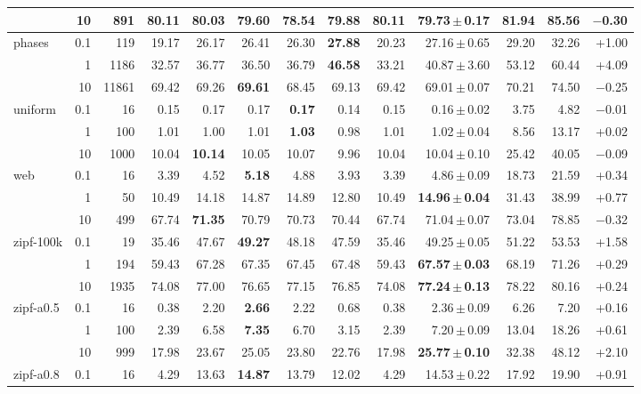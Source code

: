 \begin{tabular}{lrrrrrrrrrrrr}
 & 10 & 891 & \textbf{80.11} & 80.03 & 79.60 & 78.54 & 79.88 & \textbf{80.11} & 79.73\,$\pm$\,0.17 & 81.94 & 85.56 & $-$0.30 \\
\midrule
phases & 0.1 & 119 & 19.17 & 26.17 & 26.41 & 26.30 & \textbf{27.88} & 20.23 & 27.16\,$\pm$\,0.65 & 29.20 & 32.26 & +1.00 \\
 & 1 & 1186 & 32.57 & 36.77 & 36.50 & 36.79 & \textbf{46.58} & 33.21 & 40.87\,$\pm$\,3.60 & 53.12 & 60.44 & +4.09 \\
 & 10 & 11861 & 69.42 & 69.26 & \textbf{69.61} & 68.45 & 69.13 & 69.42 & 69.01\,$\pm$\,0.07 & 70.21 & 74.50 & $-$0.25 \\
\midrule
uniform & 0.1 & 16 & 0.15 & 0.17 & 0.17 & \textbf{0.17} & 0.14 & 0.15 & 0.16\,$\pm$\,0.02 & 3.75 & 4.82 & $-$0.01 \\
 & 1 & 100 & 1.01 & 1.00 & 1.01 & \textbf{1.03} & 0.98 & 1.01 & 1.02\,$\pm$\,0.04 & 8.56 & 13.17 & +0.02 \\
 & 10 & 1000 & 10.04 & \textbf{10.14} & 10.05 & 10.07 & 9.96 & 10.04 & 10.04\,$\pm$\,0.10 & 25.42 & 40.05 & $-$0.09 \\
\midrule
web & 0.1 & 16 & 3.39 & 4.52 & \textbf{5.18} & 4.88 & 3.93 & 3.39 & 4.86\,$\pm$\,0.09 & 18.73 & 21.59 & +0.34 \\
 & 1 & 50 & 10.49 & 14.18 & 14.87 & 14.89 & 12.80 & 10.49 & \textbf{14.96\,$\pm$\,0.04} & 31.43 & 38.99 & +0.77 \\
 & 10 & 499 & 67.74 & \textbf{71.35} & 70.79 & 70.73 & 70.44 & 67.74 & 71.04\,$\pm$\,0.07 & 73.04 & 78.85 & $-$0.32 \\
\midrule
zipf-100k & 0.1 & 19 & 35.46 & 47.67 & \textbf{49.27} & 48.18 & 47.59 & 35.46 & 49.25\,$\pm$\,0.05 & 51.22 & 53.53 & +1.58 \\
 & 1 & 194 & 59.43 & 67.28 & 67.35 & 67.45 & 67.48 & 59.43 & \textbf{67.57\,$\pm$\,0.03} & 68.19 & 71.26 & +0.29 \\
 & 10 & 1935 & 74.08 & 77.00 & 76.65 & 77.15 & 76.85 & 74.08 & \textbf{77.24\,$\pm$\,0.13} & 78.22 & 80.16 & +0.24 \\
\midrule
zipf-a0.5 & 0.1 & 16 & 0.38 & 2.20 & \textbf{2.66} & 2.22 & 0.68 & 0.38 & 2.36\,$\pm$\,0.09 & 6.26 & 7.20 & +0.16 \\
 & 1 & 100 & 2.39 & 6.58 & \textbf{7.35} & 6.70 & 3.15 & 2.39 & 7.20\,$\pm$\,0.09 & 13.04 & 18.26 & +0.61 \\
 & 10 & 999 & 17.98 & 23.67 & 25.05 & 23.80 & 22.76 & 17.98 & \textbf{25.77\,$\pm$\,0.10} & 32.38 & 48.12 & +2.10 \\
\midrule
zipf-a0.8 & 0.1 & 16 & 4.29 & 13.63 & \textbf{14.87} & 13.79 & 12.02 & 4.29 & 14.53\,$\pm$\,0.22 & 17.92 & 19.90 & +0.91 \\

\end{tabular}
